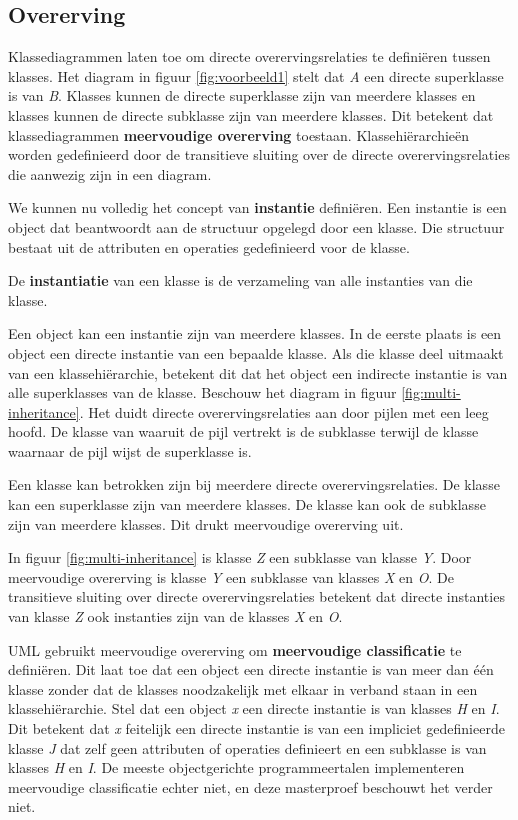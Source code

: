 \subsection{Overerving}\label{sec:semantics-gen}

Klassediagrammen laten toe om directe overervingsrelaties te defini\"eren tussen klasses. Het diagram in figuur \ref{fig:voorbeeld1} stelt dat \textit{A} een directe superklasse is van \textit{B}. Klasses kunnen de directe superklasse zijn van meerdere klasses en klasses kunnen de directe subklasse zijn van meerdere klasses. Dit betekent dat klassediagrammen \textbf{meervoudige overerving} toestaan. Klassehi\"erarchie\"en worden gedefinieerd door de transitieve sluiting over de directe overervingsrelaties die aanwezig zijn in een diagram.

We kunnen nu volledig het concept van \textbf{instantie} defini\"eren. Een instantie is een object dat beantwoordt aan de structuur opgelegd door een klasse. Die structuur bestaat uit de attributen en operaties gedefinieerd voor de klasse.

De \textbf{instantiatie} van een klasse is de verzameling van alle instanties van die klasse.

Een object kan een instantie zijn van meerdere klasses. In de eerste plaats is een object een directe instantie van een bepaalde klasse. Als die klasse deel uitmaakt van een klassehi\"erarchie, betekent dit dat het object een indirecte instantie is van alle superklasses van de klasse. Beschouw het diagram in figuur \ref{fig:multi-inheritance}. Het duidt directe overervingsrelaties aan door pijlen met een leeg hoofd. De klasse van waaruit de pijl vertrekt is de subklasse terwijl de klasse waarnaar de pijl wijst de superklasse is.

Een klasse kan betrokken zijn bij meerdere directe overervingsrelaties. De klasse kan een superklasse zijn van meerdere klasses. De klasse kan ook de subklasse zijn van meerdere klasses. Dit drukt meervoudige overerving uit.

In figuur \ref{fig:multi-inheritance} is klasse \textit{Z} een subklasse van klasse \textit{Y}. Door meervoudige overerving is klasse \textit{Y} een subklasse van klasses \textit{X} en \textit{O}. De transitieve sluiting over directe overervingsrelaties betekent dat directe instanties van klasse \textit{Z} ook instanties zijn van de klasses \textit{X} en \textit{O}.

UML gebruikt meervoudige overerving om \textbf{meervoudige classificatie}\cite{RumbaughJames2005Tuml} te defini\"eren. Dit laat toe dat een object een directe instantie is van meer dan \'e\'en klasse zonder dat de klasses noodzakelijk met elkaar in verband staan in een klassehi\"erarchie. Stel dat een object \textit{x} een directe instantie is van klasses \textit{H} en \textit{I}. Dit betekent dat \textit{x} feitelijk een directe instantie is van een impliciet gedefinieerde klasse \textit{J} dat zelf geen attributen of operaties definieert en een subklasse is van klasses \textit{H} en \textit{I}. De meeste objectgerichte programmeertalen implementeren meervoudige classificatie echter niet, en deze masterproef beschouwt het verder niet.

